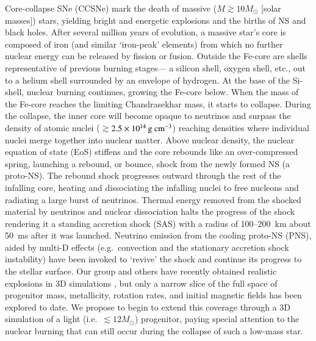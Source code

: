 Core-collapse SNe (CCSNe) mark the death of massive ($M \gtrsim 10
M_{\odot}$ [solar masses]) stars, yielding bright and energetic
explosions and the births of NS and black holes.  After
several million years of evolution, a massive star's core is composed
of iron (and similar `iron-peak' elements) from which no further
nuclear energy can be released by fission or fusion.  Outside the
Fe-core are shells representative of previous burning stages--- a
silicon shell, oxygen shell, etc., out to a helium shell surrounded by
an envelope of hydrogen.  At the base of the Si-shell, nuclear burning
continues, growing the Fe-core below.  When the mass of the Fe-core
reaches the limiting Chandrasekhar mass, it starts to collapse.
During the collapse, the inner core will become opaque to neutrinos
and surpass the density of atomic nuclei
($\gtrsim$$2.5\times10^{14}\,{\mathrm{g~cm^{-3}}}$) reaching densities where
individual nuclei merge together into nuclear matter.  Above nuclear
density, the nuclear equation of state (EoS) stiffens and the core
rebounds like an over-compressed spring, launching a rebound, or
bounce, shock from the newly formed NS (a proto-NS).  The
rebound shock progresses outward through the rest of the infalling
core, heating and dissociating the infalling nuclei to free nucleons
and radiating a large burst of neutrinos. Thermal energy removed from
the shocked material by neutrinos and nuclear dissociation halts the
progress of the shock rendering it a standing accretion shock (SAS)
with a radius of 100--200~km about 50~ms after it was
launched. Neutrino emission from the cooling proto-NS (PNS),
aided by multi-D effects (e.g.\ convection and the stationary
accretion shock instability) have been invoked to `revive' the shock
and continue its progress to the stellar surface.  Our group and
others have recently obtained realistic explosions in
3D simulations \cite{lentzetal2015,melson}, but only a
narrow slice of the full space of progenitor mass, metallicity,
rotation rates, and initial magnetic fields has been explored to
date. We propose to begin to extend this coverage through a 3D
simulation of a light (i.e.\ $\lesssim 12 M_{\odot}$) progenitor, paying
special attention to the nuclear burning that can still occur during
the collapse of such a low-mass star.
